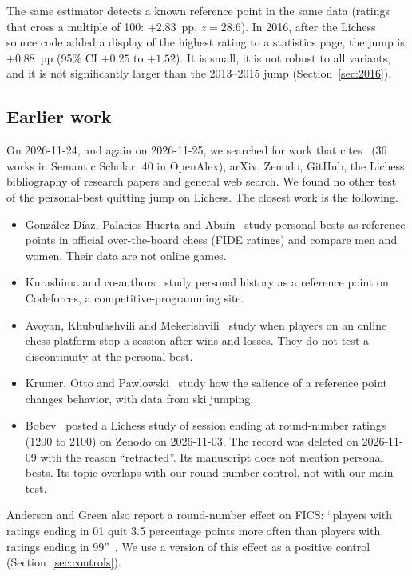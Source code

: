 \documentclass[11pt]{article}
\begin{document}
The same estimator detects a known reference point in the same data (ratings that cross a multiple of 100: $+2.83$~pp, $z=28.6$). In 2016, after the Lichess source code added a display of the highest rating to a statistics page, the jump is $+0.88$~pp (95\% CI $+0.25$ to $+1.52$). It is small, it is not robust to all variants, and it is not significantly larger than the 2013--2015 jump (Section~\ref{sec:2016}).

\subsection{Earlier work}

On 2026-11-24, and again on 2026-11-25, we searched for work that cites~\cite{ag} (36 works in Semantic Scholar, 40 in OpenAlex), arXiv, Zenodo, GitHub, the Lichess bibliography of research papers and general web search. We found no other test of the personal-best quitting jump on Lichess. The closest work is the following.

\begin{itemize}
\item González-Díaz, Palacios-Huerta and Abuín~\cite{gonzalez} study personal bests as reference points in official over-the-board chess (FIDE ratings) and compare men and women. Their data are not online games.
\item Kurashima and co-authors~\cite{kurashima} study personal history as a reference point on Codeforces, a competitive-programming site.
\item Avoyan, Khubulashvili and Mekerishvili~\cite{avoyan, avoyanssrn} study when players on an online chess platform stop a session after wins and losses. They do not test a discontinuity at the personal best.
\item Krumer, Otto and Pawlowski~\cite{krumer} study how the salience of a reference point changes behavior, with data from ski jumping.
\item Bobev~\cite{bobev} posted a Lichess study of session ending at round-number ratings (1200 to 2100) on Zenodo on 2026-11-03. The record was deleted on 2026-11-09 with the reason ``retracted''. Its manuscript does not mention personal bests. Its topic overlaps with our round-number control, not with our main test.
\end{itemize}

Anderson and Green also report a round-number effect on FICS: ``players with ratings ending in 01 quit 3.5 percentage points more often than players with ratings ending in 99''~\cite{ag}. We use a version of this effect as a positive control (Section~\ref{sec:controls}).
\end{document}

